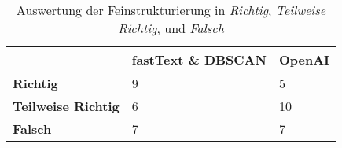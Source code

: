 \begin{table}[!ht]
	\centering
	\begin{tabular}{|l|l|l|}
		\hline
		\textbf{} & \textbf{fastText \& DBSCAN} & \textbf{OpenAI} \\ \hline
		\textbf{Richtig} & 9 & 5 \\ \hline
		\textbf{Teilweise Richtig} & 6 & 10 \\ \hline
		\textbf{Falsch} & 7 & 7 \\ \hline
	\end{tabular}
	\caption{Auswertung der Feinstrukturierung in \textit{Richtig}, \textit{Teilweise Richtig}, und \textit{Falsch}}
	\label{t:structuring-result}
\end{table}